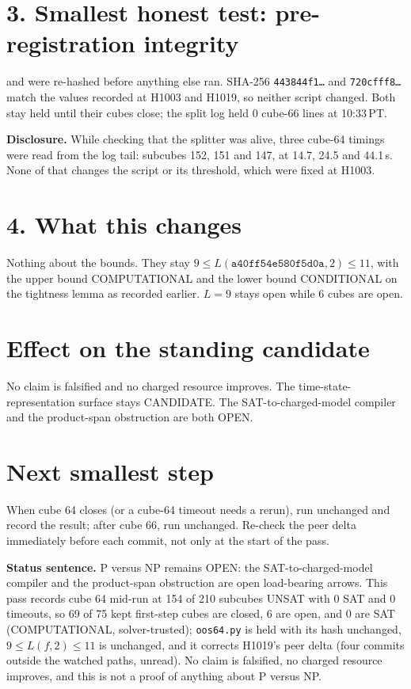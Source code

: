 \documentclass[11pt]{article}
\begin{document}
\section*{3. Smallest honest test: pre-registration integrity}
 and  were re-hashed before anything else ran. SHA-256 \texttt{443844f1\ldots} and \texttt{720cfff8\ldots} match the values recorded at H1003 and H1019, so neither script changed. Both stay held until their cubes close; the split log held 0 cube-66 lines at 10:33\,PT.

\textbf{Disclosure.} While checking that the splitter was alive, three cube-64 timings were read from the log tail: subcubes 152, 151 and 147, at 14.7, 24.5 and 44.1\,s. None of that changes the script or its threshold, which were fixed at H1003.

\section*{4. What this changes}
Nothing about the bounds. They stay $9\le L(\texttt{a40ff54e580f5d0a},2)\le 11$, with the upper bound COMPUTATIONAL and the lower bound CONDITIONAL on the tightness lemma as recorded earlier. $L=9$ stays open while 6 cubes are open.

\section*{Effect on the standing candidate}
No claim is falsified and no charged resource improves. The time-state-representation surface stays CANDIDATE. The SAT-to-charged-model compiler and the product-span obstruction are both OPEN.

\section*{Next smallest step}
When cube 64 closes (or a cube-64 timeout needs a rerun), run  unchanged and record the result; after cube 66, run  unchanged. Re-check the peer delta immediately before each commit, not only at the start of the pass.

\bigskip
\noindent\textbf{Status sentence.} P versus NP remains OPEN: the SAT-to-charged-model compiler and the product-span obstruction are open load-bearing arrows. This pass records cube 64 mid-run at 154 of 210 subcubes UNSAT with 0 SAT and 0 timeouts, so 69 of 75 kept first-step cubes are closed, 6 are open, and 0 are SAT (COMPUTATIONAL, solver-trusted); \texttt{oos64.py} is held with its hash unchanged, $9\le L(f,2)\le 11$ is unchanged, and it corrects H1019's peer delta (four commits outside the watched paths, unread). No claim is falsified, no charged resource improves, and this is not a proof of anything about P versus NP.
\end{document}

